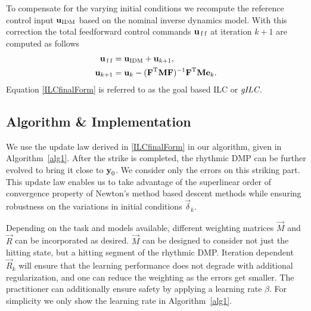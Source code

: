 To compensate for the varying initial conditions we recompute the reference control input $\boldsymbol{\mathrm{u}}_{\mathrm{IDM}}$ based on the nominal inverse dynamics model. With this correction the total feedforward control commands $\boldsymbol{\mathrm{u}}_{\mathrm{\,f\,f}}$ at iteration $k+1$ are computed as follows
%
\begin{equation}
\begin{aligned}
\boldsymbol{\mathrm{u}}_{\mathrm{\,f\,f}} &= \boldsymbol{\mathrm{u}}_{\mathrm{IDM}} + \boldsymbol{\mathrm{u}}_{k+1}, \\
\boldsymbol{\mathrm{u}}_{k+1} &= \boldsymbol{\mathrm{u}}_k - (\boldsymbol{\mathrm{F}}^{\mathrm{T}}\boldsymbol{\mathrm{M}}\boldsymbol{\mathrm{F}})^{-1}\boldsymbol{\mathrm{F}}^{\mathrm{T}}\boldsymbol{\mathrm{M}}\boldsymbol{\mathrm{e}}_k.\\
\end{aligned}
\label{ILCfinalForm}
\end{equation}
%
\noindent Equation \eqref{ILCfinalForm} is referred to as the goal based ILC or $\emph{gILC}$.


\subsection{Algorithm \& Implementation}\label{algorithm}

We use the update law derived in \eqref{ILCfinalForm} in our algorithm, given in Algorithm~\ref{alg1}. After the strike is completed, the rhythmic DMP can be further evolved to bring it close to $\boldsymbol{\mathrm{y}}_0$. We consider only the errors on this striking part. This update law enables us to take advantage of the superlinear order of convergence property of Newton's method based descent methods while ensuring robustness on the variations in initial conditions $\vec{\delta}_k$. 

Depending on the task and models available, different weighting matrices $\vec{M}$ and $\vec{R}$ can be incorporated as desired. $\vec{M}$ can be designed to consider not just the hitting state, but a hitting segment of the rhythmic DMP. Iteration dependent $\vec{R}_k$ will ensure that the learning performance does not degrade with additional regularization, and one can reduce the weighting as the errors get smaller. The practitioner can additionally ensure safety by applying a learning rate $\beta$. For simplicity we only show the learning rate in Algorithm~\ref{alg1}.%


